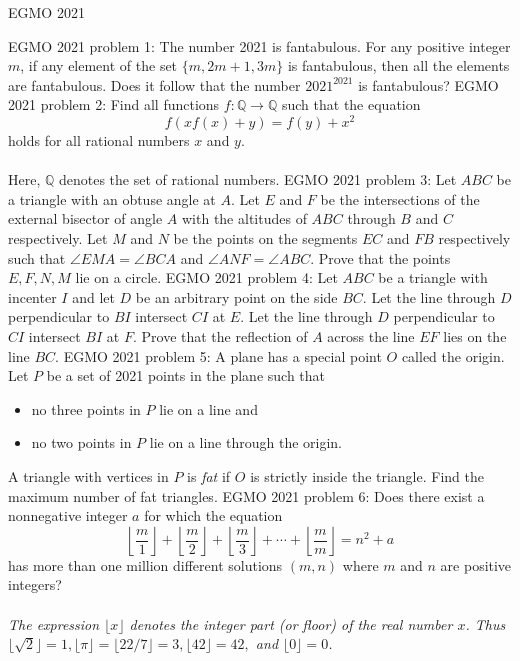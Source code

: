 
EGMO 2021 

EGMO 2021 problem 1:  The number 2021 is fantabulous. For any positive integer $m$, if any element of the set $\{m, 2m+1, 3m\}$ is fantabulous, then all the elements are fantabulous. Does it follow that the number $2021^{2021}$ is fantabulous? 
EGMO 2021 problem 2:  Find all functions $f:\mathbb{Q}\to\mathbb{Q}$ such that the equation
\[ f(xf(x)+y) = f(y) + x^2 \]
holds for all rational numbers $x$ and $y$. \\\\
Here, $\mathbb{Q}$ denotes the set of rational numbers. 
EGMO 2021 problem 3:  Let $ABC$ be a triangle with an obtuse angle at $A$. Let $E$ and $F$ be the intersections of the external bisector of angle $A$ with the altitudes of $ABC$ through $B$ and $C$ respectively. Let $M$ and $N$ be the points on the segments $EC$ and $FB$ respectively such that $\angle EMA = \angle BCA$ and $\angle ANF = \angle ABC$. Prove that the points $E, F, N, M$ lie on a circle. 
EGMO 2021 problem 4:  Let $ABC$ be a triangle with incenter $I$ and let $D$ be an arbitrary point on the side $BC$. Let the line through $D$ perpendicular to $BI$ intersect $CI$ at $E$. Let the line through $D$ perpendicular to $CI$ intersect $BI$ at $F$. Prove that the reflection of $A$ across the line $EF$ lies on the line $BC$. 
EGMO 2021 problem 5:  A plane has a special point $O$ called the origin. Let $P$ be a set of 2021 points in the plane such that
\begin{itemize}
  \item no three points in $P$ lie on a line and
  \item no two points in $P$ lie on a line through the origin.
\end{itemize}
A triangle with vertices in $P$ is \textit{fat} if $O$ is strictly inside the triangle. Find the maximum number of fat triangles. 
EGMO 2021 problem 6:  Does there exist a nonnegative integer $a$ for which the equation
\[
\left\lfloor\frac{m}{1}\right\rfloor + \left\lfloor\frac{m}{2}\right\rfloor + \left\lfloor\frac{m}{3}\right\rfloor + \cdots + \left\lfloor\frac{m}{m}\right\rfloor = n^2 + a
\]
has more than one million different solutions $(m, n)$ where $m$ and $n$ are positive integers? \\\\
\textit{The expression $\lfloor x\rfloor$ denotes the integer part (or floor) of the real number $x$. Thus $\lfloor\sqrt{2}\rfloor = 1, \lfloor\pi\rfloor =\lfloor 22/7 \rfloor = 3, \lfloor 42\rfloor = 42,$ and $\lfloor 0 \rfloor = 0$.} 

